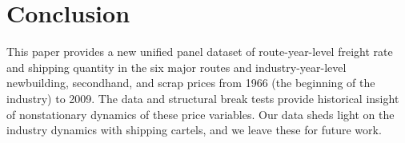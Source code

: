 \documentclass[11pt]{article}
\begin{document}
\section{Conclusion}\label{sec:conclusion}
This paper provides a new unified panel dataset of route-year-level freight rate and shipping quantity in the six major routes and industry-year-level newbuilding, secondhand, and scrap prices from 1966 (the beginning of the industry) to 2009. The data and structural break tests provide historical insight of nonstationary dynamics of these price variables. Our data sheds light on the industry dynamics with shipping cartels, and we leave these for future work. 


\appendix

% 
% 


\newpage


\end{document}
